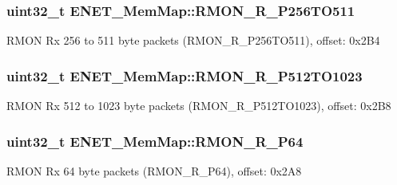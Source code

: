 \subsubsection[{R\+M\+O\+N\+\_\+\+R\+\_\+\+P256\+T\+O511}]{\setlength{\rightskip}{0pt plus 5cm}uint32\+\_\+t E\+N\+E\+T\+\_\+\+Mem\+Map\+::\+R\+M\+O\+N\+\_\+\+R\+\_\+\+P256\+T\+O511}\label{struct_e_n_e_t___mem_map_a2f120e220238a9e7ffea616be9277d07}
R\+M\+O\+N Rx 256 to 511 byte packets (R\+M\+O\+N\+\_\+\+R\+\_\+\+P256\+T\+O511), offset\+: 0x2\+B4 \hypertarget{struct_e_n_e_t___mem_map_a63eddfbc250571ccb66870db72338ff3}{}
\subsubsection[{R\+M\+O\+N\+\_\+\+R\+\_\+\+P512\+T\+O1023}]{\setlength{\rightskip}{0pt plus 5cm}uint32\+\_\+t E\+N\+E\+T\+\_\+\+Mem\+Map\+::\+R\+M\+O\+N\+\_\+\+R\+\_\+\+P512\+T\+O1023}\label{struct_e_n_e_t___mem_map_a63eddfbc250571ccb66870db72338ff3}
R\+M\+O\+N Rx 512 to 1023 byte packets (R\+M\+O\+N\+\_\+\+R\+\_\+\+P512\+T\+O1023), offset\+: 0x2\+B8 \hypertarget{struct_e_n_e_t___mem_map_a3bd678a87a37ddd0a65afd0fcc4cc6d1}{}
\subsubsection[{R\+M\+O\+N\+\_\+\+R\+\_\+\+P64}]{\setlength{\rightskip}{0pt plus 5cm}uint32\+\_\+t E\+N\+E\+T\+\_\+\+Mem\+Map\+::\+R\+M\+O\+N\+\_\+\+R\+\_\+\+P64}\label{struct_e_n_e_t___mem_map_a3bd678a87a37ddd0a65afd0fcc4cc6d1}
R\+M\+O\+N Rx 64 byte packets (R\+M\+O\+N\+\_\+\+R\+\_\+\+P64), offset\+: 0x2\+A8 \hypertarget{struct_e_n_e_t___mem_map_af28ed1d2b882b6c0335d4c04a0c1ac2c}{}
